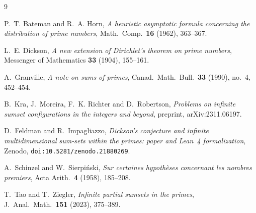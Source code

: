 \documentclass[11pt]{amsart}
\theoremstyle{remark}
\begin{document}
\begin{thebibliography}{9}

P.~T. Bateman and R.~A. Horn,
\emph{A heuristic asymptotic formula concerning the distribution of
prime numbers},
Math.\ Comp.\ \textbf{16} (1962), 363--367.

L.~E. Dickson,
\emph{A new extension of Dirichlet's theorem on prime numbers},
Messenger of Mathematics \textbf{33} (1904), 155--161.

A.~Granville,
\emph{A note on sums of primes},
Canad.\ Math.\ Bull.\ \textbf{33} (1990), no.~4, 452--454.

B.~Kra, J.~Moreira, F.~K. Richter and D.~Robertson,
\emph{Problems on infinite sumset configurations in the integers and
beyond}, preprint, arXiv:2311.06197.

D.~Feldman and R.~Impagliazzo,
\emph{Dickson's conjecture and infinite multidimensional sum-sets
within the primes: paper and Lean~4 formalization},
Zenodo, \texttt{doi:10.5281/zenodo.21880269}.

A.~Schinzel and W.~Sierpi\'nski,
\emph{Sur certaines hypoth\`eses concernant les nombres premiers},
Acta Arith.\ \textbf{4} (1958), 185--208.

T.~Tao and T.~Ziegler,
\emph{Infinite partial sumsets in the primes},
J.\ Anal.\ Math.\ \textbf{151} (2023), 375--389.

\end{thebibliography}
\end{document}
